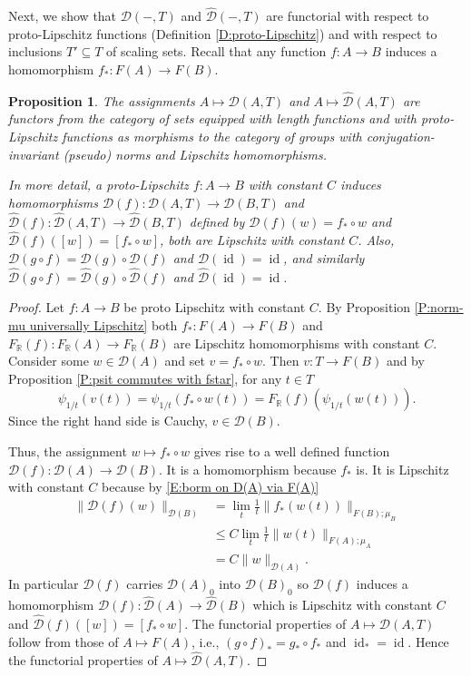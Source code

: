 \documentclass[12pt]{amsart}
\newtheorem{prop}{Proposition}[section]
\theoremstyle{definition}
\def\RR{\ensuremath{\mathbb{R}}}
\newcommand{\C}[1]{\mathcal{#1}}
\newcommand{\OP}[1]{\operatorname{#1}}
\def\Free{F}
\def\D{\mathcal{D}}
\def\tD{\hat{\D}}
\begin{document}
Next, we show that $\C D(-,T)$ and $\tD(-,T)$ are functorial with respect to proto-Lipschitz functions (Definition \ref {D:proto-Lipschitz}) and with respect to inclusions $T' \subseteq T$ of scaling sets.
Recall that any function $f \colon A \to B$ induces a homomorphism $f_* \colon \Free(A) \to \Free(B)$.

\begin{prop}\label{P:naturality D and tD}
The assignments $A \mapsto \C D(A,T)$ and $A \mapsto \tD(A,T)$ are functors from the category of sets equipped with length functions and with proto-Lipschitz functions as morphisms to the category of groups with conjugation-invariant (pseudo) norms and Lipschitz homomorphisms.

In more detail, a proto-Lipschitz $f \colon A \to B$ with constant $C$ induces homomorphisms $\C D(f) \colon \C D(A,T) \to \C D(B,T)$ and $\tD(f) \colon \tD(A,T) \to \tD(B,T)$ defined by $\C D(f)(w) = f_* \circ w$ and $\tD(f)([w]) = [f_* \circ w]$, both are Lipschitz with constant $C$.
Also, $\C D(g \circ f)=\C D(g) \circ \C D(f)$ and $\C D(\OP{id})=\OP{id}$, and similarly $\tD(g \circ f)=\tD(g) \circ \tD(f)$ and $\tD(\OP{id})=\OP{id}$.
\end{prop}


\begin{proof}
Let $f \colon A \to B$ be proto Lipschitz with constant $C$.
By Proposition \ref{P:norm-mu universally Lipschitz} both $f_* \colon \Free(A) \to \Free(B)$ and $\Free_\RR(f) \colon \Free_\RR(A) \to \Free_\RR(B)$ are Lipschitz homomorphisms with constant $C$.
Consider some $w \in \C D(A)$ and set $v=f_* \circ w$.
Then $v \colon T \to \Free(B)$ and by Proposition \ref{P:psit commutes with fstar}, for any $t \in T$
\[
\psi_{1/t}(v(t))= \psi_{1/t}(f_* \circ w(t)) = \Free_\RR(f) (\psi_{1/t}(w(t))).
\]
Since the right hand side is Cauchy, $v \in \C D(B)$.

Thus, the assignment $w \mapsto f_* \circ w$ gives rise to a well defined function $\C D(f) \colon \C D(A) \to \C D(B)$.
It is a homomorphism because $f_*$ is.
It is Lipschitz with constant $C$ because %
by \eqref{E:borm on D(A) via F(A)}
\begin{align*}
\| \C D(f)(w)\|_{\C D(B)} &=
\lim_t \tfrac{1}{t} \| f_*(w(t))\|_{\Free(B);\mu_B} \\
& \leq
C \lim_t \tfrac{1}{t} \| w(t)\|_{\Free(A);\mu_A} 
\\
&=
C \| w\|_{\C D(A)}.
\end{align*}
In particular $\C D(f)$ carries $\C D(A)_0$ into $\C D(B)_0$ so $\C D(f)$ induces a homomorphism $\tD(f) \colon \tD(A) \to \tD(B)$ which is Lipschitz with constant $C$ and $\tD(f)([w])=[f_* \circ w]$.
The functorial properties of $A \mapsto \C D(A,T)$ follow from those of $A \mapsto \Free(A)$, i.e., $(g \circ f)_*=g_* \circ f_*$ and $\OP{id}_*=\OP{id}$.
Hence the functorial properties of $A \mapsto \tD(A,T)$.
\end{proof}
\end{document}
